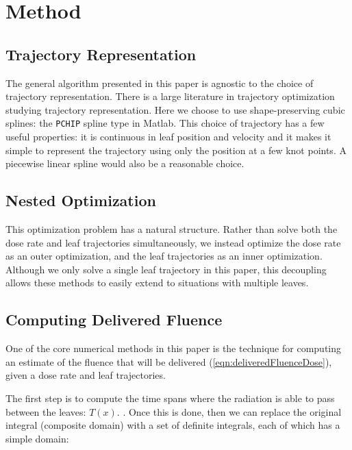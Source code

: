 \section{Method}

\subsection{Trajectory Representation}

The general algorithm presented in this paper is agnostic to the choice of trajectory representation.
There is a large literature in trajectory optimization studying trajectory representation. 
Here we choose to use shape-preserving cubic splines: the \texttt{PCHIP} spline type in Matlab.
This choice of trajectory has a few useful properties: it is continuous in leaf position and velocity
and it makes it simple to represent the trajectory using only the position at a few knot points.
A piecewise linear spline would also be a reasonable choice.


\subsection{Nested Optimization}

This optimization problem has a natural structure.
Rather than solve both the dose rate and leaf trajectories simultaneously,
we instead optimize the dose rate as an outer optimization, and the leaf trajectories as an inner optimization.
Although we only solve a single leaf trajectory in this paper, this decoupling allows these methods to easily extend to situations with multiple leaves.


\subsection{Computing Delivered Fluence}

One of the core numerical methods in this paper is the technique for computing an estimate of the fluence
that will be delivered (\ref{eqn:deliveredFluenceDose}), given a dose rate and leaf trajectories.

The first step is to compute the time spans where the radiation is able to pass between the leaves: $T(x)$.
.
Once this is done, then we can replace the original integral (composite domain) with a set of definite integrals,
each of which has a simple domain:

